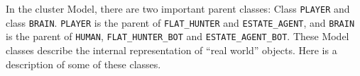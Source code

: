 In the cluster Model, there are two important parent classes: Class \texttt{PLAYER} and class \texttt{BRAIN}. \texttt{PLAYER} is the parent of \texttt{FLAT\_HUNTER} and \texttt{ESTATE\_AGENT}, and \texttt{BRAIN} is the parent of \texttt{HUMAN}, \texttt{FLAT\_HUNTER\_BOT} and \texttt{ESTATE\_AGENT\_BOT}. These Model classes describe the internal representation of ``real world'' objects. Here is a description of some of these classes.

